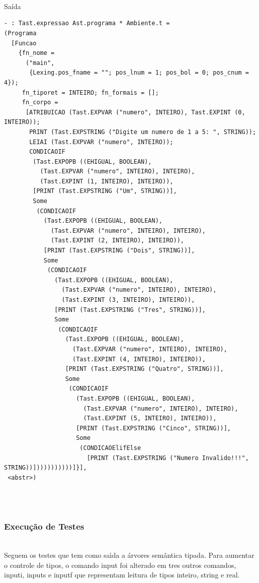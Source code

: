 \documentclass{article}
\begin{document}
\\\\\\Saída
\begin{lstlisting}
- : Tast.expressao Ast.programa * Ambiente.t =
(Programa
  [Funcao
    {fn_nome =
      ("main",
       {Lexing.pos_fname = ""; pos_lnum = 1; pos_bol = 0; pos_cnum = 4});
     fn_tiporet = INTEIRO; fn_formais = [];
     fn_corpo =
      [ATRIBUICAO (Tast.EXPVAR ("numero", INTEIRO), Tast.EXPINT (0, INTEIRO));
       PRINT (Tast.EXPSTRING ("Digite um numero de 1 a 5: ", STRING));
       LEIAI (Tast.EXPVAR ("numero", INTEIRO));
       CONDICAOIF
        (Tast.EXPOPB ((EHIGUAL, BOOLEAN),
          (Tast.EXPVAR ("numero", INTEIRO), INTEIRO),
          (Tast.EXPINT (1, INTEIRO), INTEIRO)),
        [PRINT (Tast.EXPSTRING ("Um", STRING))],
        Some
         (CONDICAOIF
           (Tast.EXPOPB ((EHIGUAL, BOOLEAN),
             (Tast.EXPVAR ("numero", INTEIRO), INTEIRO),
             (Tast.EXPINT (2, INTEIRO), INTEIRO)),
           [PRINT (Tast.EXPSTRING ("Dois", STRING))],
           Some
            (CONDICAOIF
              (Tast.EXPOPB ((EHIGUAL, BOOLEAN),
                (Tast.EXPVAR ("numero", INTEIRO), INTEIRO),
                (Tast.EXPINT (3, INTEIRO), INTEIRO)),
              [PRINT (Tast.EXPSTRING ("Tres", STRING))],
              Some
               (CONDICAOIF
                 (Tast.EXPOPB ((EHIGUAL, BOOLEAN),
                   (Tast.EXPVAR ("numero", INTEIRO), INTEIRO),
                   (Tast.EXPINT (4, INTEIRO), INTEIRO)),
                 [PRINT (Tast.EXPSTRING ("Quatro", STRING))],
                 Some
                  (CONDICAOIF
                    (Tast.EXPOPB ((EHIGUAL, BOOLEAN),
                      (Tast.EXPVAR ("numero", INTEIRO), INTEIRO),
                      (Tast.EXPINT (5, INTEIRO), INTEIRO)),
                    [PRINT (Tast.EXPSTRING ("Cinco", STRING))],
                    Some
                     (CONDICAOElifElse
                       [PRINT (Tast.EXPSTRING ("Numero Invalido!!!", STRING))]))))))))))]}],
 <abstr>)

\end{lstlisting}\\
\



\subsubsection{Execução de Testes}

\\Seguem os testes que tem como saı́da a árvores semântica tipada. Para
aumentar o controle de tipos, o comando input foi alterado em tres outros
comandos, inputi, inputs e inputf que representam leitura de tipos inteiro,
string e real.
\end{document}
